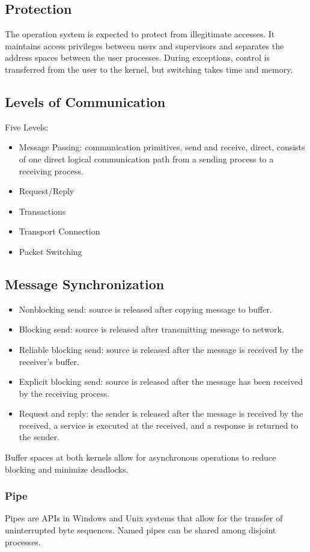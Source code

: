 \documentclass{math}
\begin{document}
\subsection*{Protection}
The operation system is expected to protect from illegitimate accesses. It
maintains access privileges between users and supervisors and separates the
address spaces between the user processes. During exceptions, control is
transferred from the user to the kernel, but switching takes time and memory.

\subsection*{Levels of Communication}
Five Levels:
\begin{itemize}
  \item Message Passing: communication primitives, send and receive, direct,
  consists of one direct logical communication path from a sending process to a
  receiving process.
  \item Request/Reply
  \item Transactions
  \item Transport Connection
  \item Packet Switching
\end{itemize}

\subsection*{Message Synchronization}
\begin{itemize}
  \item Nonblocking send: source is released after copying message to buffer.
  \item Blocking send: source is released after transmitting message to network.
  \item Reliable blocking send: source is released after the message is
  received by the receiver's buffer.
  \item Explicit blocking send: source is released after the message has been
  received by the receiving process.
  \item Request and reply: the sender is released after the message is received
  by the received, a service is executed at the received, and a response is
  returned to the sender.
\end{itemize}
Buffer spaces at both kernels allow for asynchronous operations to reduce
blocking and minimize deadlocks.

\subsubsection*{Pipe}
Pipes are APIs in Windows and Unix systems that allow for the transfer of
uninterrupted byte sequences. Named pipes can be shared among disjoint
processes.
\end{document}
